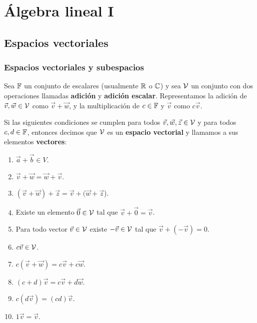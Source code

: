\chapter{Álgebra lineal I} %
\label{cha:algebra_lineal_i}

\section{Espacios vectoriales} %
\label{sec:espacios_vectoriales}

\subsection{Espacios vectoriales y subespacios} %
\label{sub:espacios_vectoriales_y_subespacios}

\begin{definition}
	\label{def:espacio_vectorial}
	Sea \(\mathbb{F}\) un conjunto de escalares (usualmente \(\mathbb{R}\) o \(\mathbb{C}\)) y sea 
	\(\mathcal{V}\) un conjunto con dos operaciones llamadas \textbf{adición} y 
	\textbf{adición	escalar}. Representamos la adición de \(\vec{v}, 
	\vec{w} \in \mathcal{V}\) como \(\vec{v} + \vec{w}\), y la multiplicación de \(c
	\in \mathbb{F}\) y \(\vec{v}\) como \(c\vec{v}\).

	Si las siguientes condiciones se cumplen para todos \(\vec{v}, \vec{w}, 
	\vec{z} \in \mathcal{V}\) y para todos \(c,d \in \mathbb{F}\), entonces decimos que \(\mathcal{V}\) 
	es un \textbf{espacio vectorial} y llamamos a sus elementos 
	\textbf{vectores}:

	\begin{enumerate}
		\item \(\vec{a} + \vec{b} \in V\).

		\item \(\vec{v} + \vec{w} = \vec{w} + \vec{v}\).

		\item \((\vec{v} + \vec{w} ) +  \vec{z} = \vec{v} + (\vec{w} + 
		\vec{z}\)).

		\item Existe un elemento \(\vec{0} \in \mathcal{V}\) tal que \(\vec{v} + 
		\vec{0} = \vec{v}\).

		\item Para todo vector \(\vec{v} \in \mathcal{V}\) existe \(-\vec{v} \in \mathcal{V}\)
		tal que \(\vec{v} + (-\vec{v}) = 0\).

		\item \(c \vec{v} \in \mathcal{V}\).

		\item \(c(\vec{v} + \vec{w}) = c \vec{v} + c \vec{w} \).

		\item \((c+d) \vec{v} = c \vec{v} + d \vec{w}\).

		\item \(c(d \vec{v}) = (cd) \vec{v}\).

		\item \(1 \vec{v} = \vec{v}\).
	\end{enumerate}
	
\end{definition}

